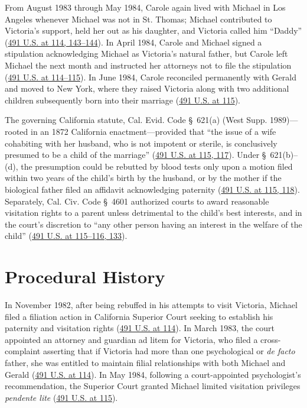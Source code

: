 \documentclass[12pt]{article}
\begin{document}
From August 1983 through May 1984, Carole again lived with Michael in Los Angeles whenever Michael was not in St. Thomas; Michael contributed to Victoria's support, held her out as his daughter, and Victoria called him ``Daddy'' (\href{https://supreme.justia.com/cases/federal/us/491/110/}{491 U.S. at 114, 143--144}). In April 1984, Carole and Michael signed a stipulation acknowledging Michael as Victoria's natural father, but Carole left Michael the next month and instructed her attorneys not to file the stipulation (\href{https://supreme.justia.com/cases/federal/us/491/110/}{491 U.S. at 114--115}). In June 1984, Carole reconciled permanently with Gerald and moved to New York, where they raised Victoria along with two additional children subsequently born into their marriage (\href{https://supreme.justia.com/cases/federal/us/491/110/}{491 U.S. at 115}).

The governing California statute, Cal. Evid. Code \S~621(a) (West Supp. 1989)---rooted in an 1872 California enactment---provided that ``the issue of a wife cohabiting with her husband, who is not impotent or sterile, is conclusively presumed to be a child of the marriage'' (\href{https://supreme.justia.com/cases/federal/us/491/110/}{491 U.S. at 115, 117}). Under \S~621(b)--(d), the presumption could be rebutted by blood tests only upon a motion filed within two years of the child's birth by the husband, or by the mother if the biological father filed an affidavit acknowledging paternity (\href{https://supreme.justia.com/cases/federal/us/491/110/}{491 U.S. at 115, 118}). Separately, Cal. Civ. Code \S~4601 authorized courts to award reasonable visitation rights to a parent unless detrimental to the child's best interests, and in the court's discretion to ``any other person having an interest in the welfare of the child'' (\href{https://supreme.justia.com/cases/federal/us/491/110/}{491 U.S. at 115--116, 133}).

\section{Procedural History}

In November 1982, after being rebuffed in his attempts to visit Victoria, Michael filed a filiation action in California Superior Court seeking to establish his paternity and visitation rights (\href{https://supreme.justia.com/cases/federal/us/491/110/}{491 U.S. at 114}). In March 1983, the court appointed an attorney and guardian ad litem for Victoria, who filed a cross-complaint asserting that if Victoria had more than one psychological or \textit{de facto} father, she was entitled to maintain filial relationships with both Michael and Gerald (\href{https://supreme.justia.com/cases/federal/us/491/110/}{491 U.S. at 114}). In May 1984, following a court-appointed psychologist's recommendation, the Superior Court granted Michael limited visitation privileges \textit{pendente lite} (\href{https://supreme.justia.com/cases/federal/us/491/110/}{491 U.S. at 115}).
\end{document}
